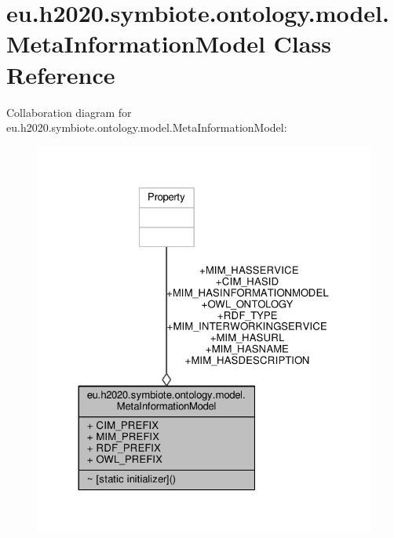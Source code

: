 \hypertarget{classeu_1_1h2020_1_1symbiote_1_1ontology_1_1model_1_1MetaInformationModel}{}\section{eu.\+h2020.\+symbiote.\+ontology.\+model.\+Meta\+Information\+Model Class Reference}
\label{classeu_1_1h2020_1_1symbiote_1_1ontology_1_1model_1_1MetaInformationModel}


Collaboration diagram for eu.\+h2020.\+symbiote.\+ontology.\+model.\+Meta\+Information\+Model\+:
\nopagebreak
\begin{figure}[H]
\begin{center}
\leavevmode
\includegraphics[width=324pt]{classeu_1_1h2020_1_1symbiote_1_1ontology_1_1model_1_1MetaInformationModel__coll__graph}
\end{center}
\end{figure}
